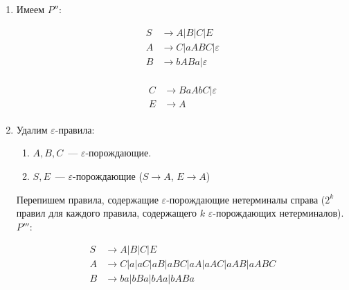\documentclass[a4paper]{article}
\def\eps{\varepsilon}
\begin{document}
\begin{enumerate}
\begin{multicols}{2}
	\begin{align*}
		C &\to BaAbC|\cancel{aGD}|\eps\\
		F &\to \cancel{aBaaCbA|aGE}\\
		E &\to A\\			
	\end{align*}	
\end{multicols}
\vspace{-7ex}
\item[1,2.] Имеем $P''$:
\vspace{-7ex}
\begin{multicols}{2}
	\begin{align*}
		S &\to A|B|C|E\\
		A &\to C |aABC|\eps\\
		B &\to bABa|\eps\\
	\end{align*}

	\begin{align*}
		C &\to BaAbC|\eps\\
		E &\to A\\			
	\end{align*}	
\end{multicols}
\vspace{-7ex}
\item Удалим $\varepsilon$-правила:\begin{enumerate}
\item $A,B,C$~--- $\varepsilon$-порождающие.
\item $S,E$~--- $\varepsilon$-порождающие ($S\rightarrow A$, $E\rightarrow A$)
\end{enumerate}
Перепишем правила, содержащие $\varepsilon$-порождающие нетерминалы справа ($2^k$ правил для каждого правила, содержащего $k$ $\varepsilon$-порождающих нетерминалов). $P'''$:
\vspace{-7ex}
\begin{multicols}{2}
	\begin{align*}
		S &\to A|B|C|E\\
		A &\to C|a|aC|aB|aBC|aA|aAC|aAB|aABC\\
		B &\to ba|bBa|bAa|bABa\\
	\end{align*}


\end{multicols}
\end{enumerate}
\end{document}

